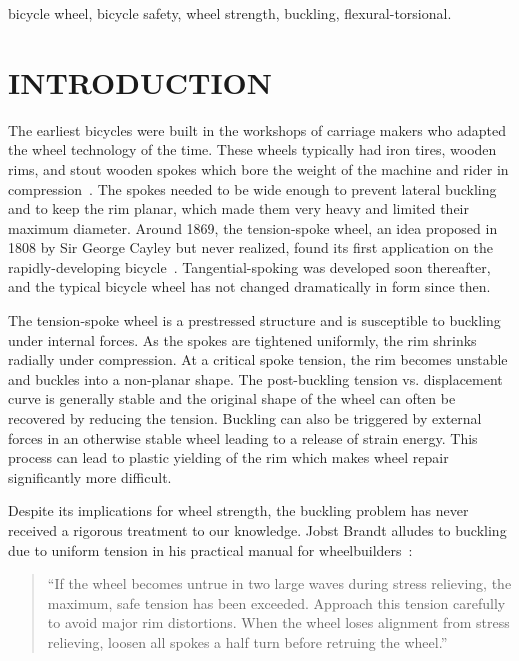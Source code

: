 \documentclass{bmd2016p}
\begin{document}
\begin{keywords}
bicycle wheel, 
bicycle safety, 
wheel strength, 
buckling, 
flexural-torsional.
\end{keywords}



\section{INTRODUCTION}
The earliest bicycles were built in the workshops of carriage makers who adapted the wheel technology of the time. These wheels typically had iron tires, wooden rims, and stout wooden spokes which bore the weight of the machine and rider in compression~\cite{Herlihy2004a}. The spokes needed to be wide enough to prevent lateral buckling and to keep the rim planar, which made them very heavy and limited their maximum diameter. Around 1869, the tension-spoke wheel, an idea proposed in 1808 by Sir George Cayley but never realized, found its first application on the rapidly-developing bicycle~\cite{Ackroyd2011a,Clayton1991b}. Tangential-spoking was developed soon thereafter, and the typical bicycle wheel has not changed dramatically in form since then.

The tension-spoke wheel is a prestressed structure and is susceptible to buckling under internal forces. As the spokes are tightened uniformly, the rim shrinks radially under compression. At a critical spoke tension, the rim becomes unstable and buckles into a non-planar shape. The post-buckling tension vs. displacement curve is generally stable and the original shape of the wheel can often be recovered by reducing the tension. Buckling can also be triggered by external forces in an otherwise stable wheel leading to a release of strain energy. This process can lead to plastic yielding of the rim which makes wheel repair significantly more difficult.

Despite its implications for wheel strength, the buckling problem has never received a rigorous treatment to our knowledge. Jobst Brandt alludes to buckling due to uniform tension in his practical manual for wheelbuilders~\cite{Brandt1993c}:

\begin{quotation}
\noindent``If the wheel becomes untrue in two large waves during stress relieving, the maximum, safe tension has been exceeded. Approach this tension carefully to avoid major rim distortions. When the wheel loses alignment from stress relieving, loosen all spokes a half turn before retruing the wheel.''
\end{quotation}
\end{document}
